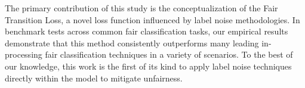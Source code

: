 The primary contribution of this study is the conceptualization of the Fair Transition Loss, a novel loss function influenced by label noise methodologies. In benchmark tests across common fair classification tasks, our empirical results demonstrate that this method consistently outperforms many leading in-processing fair classification techniques in a variety of scenarios. To the best of our knowledge, this work is the first of its kind to apply label noise techniques directly within the model to mitigate unfairness. 

